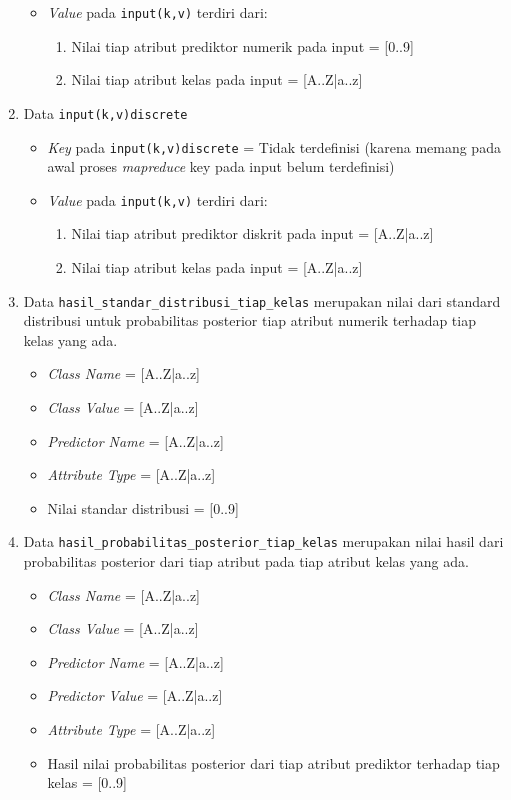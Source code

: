 \begin{enumerate}
\begin{itemize}
		\item \textit{Value} pada \verb|input(k,v)| terdiri dari:
		\begin{enumerate}
			\item Nilai tiap atribut prediktor numerik pada input = [0..9]
			\item Nilai tiap atribut kelas pada input = [A..Z|a..z]
		\end{enumerate}
		
	\end{itemize}

	\item{Data \verb|input(k,v)discrete|}
	\begin{itemize}
		\item \textit{Key} pada \verb|input(k,v)discrete| = Tidak terdefinisi (karena memang pada awal proses \textit{mapreduce} key pada input belum terdefinisi)

		\item \textit{Value} pada \verb|input(k,v)| terdiri dari:
		\begin{enumerate}
			\item Nilai tiap atribut prediktor diskrit pada input = [A..Z|a..z]
			\item Nilai tiap atribut kelas pada input = [A..Z|a..z]
		\end{enumerate}
		
	\end{itemize}

	\item{Data \verb|hasil_standar_distribusi_tiap_kelas|} merupakan nilai dari standard distribusi untuk probabilitas posterior tiap atribut numerik terhadap tiap kelas yang ada.
	\begin{itemize}
		\item \textit{Class Name} = [A..Z|a..z]
		\item \textit{Class Value} = [A..Z|a..z]
		\item \textit{Predictor Name} = [A..Z|a..z]
		\item \textit{Attribute Type} = [A..Z|a..z]
		\item Nilai standar distribusi = [0..9]
	\end{itemize}
	

	\item{Data \verb|hasil_probabilitas_posterior_tiap_kelas|}
	merupakan nilai hasil dari probabilitas posterior dari tiap atribut pada tiap atribut kelas yang ada.
	\begin{itemize}
		\item \textit{Class Name} = [A..Z|a..z]
		\item \textit{Class Value} = [A..Z|a..z]
		\item \textit{Predictor Name} = [A..Z|a..z]
		\item \textit{Predictor Value} = [A..Z|a..z]
		\item \textit{Attribute Type} = [A..Z|a..z]
		\item Hasil nilai probabilitas posterior dari tiap atribut prediktor terhadap tiap kelas = [0..9]
	\end{itemize}


\end{enumerate}

